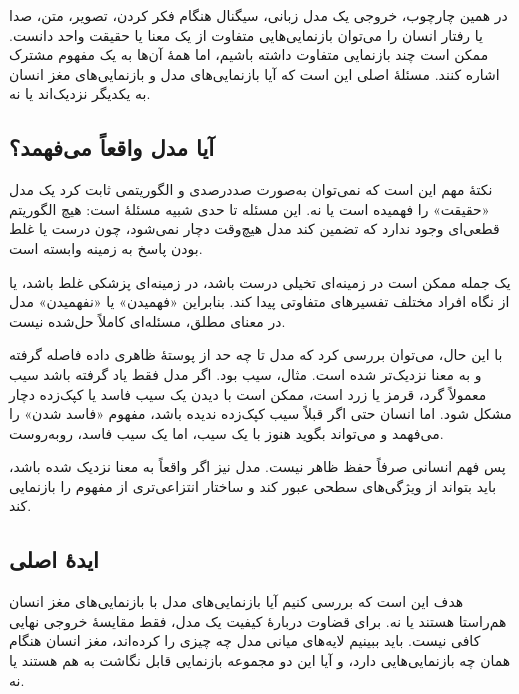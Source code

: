 در همین چارچوب، خروجی یک مدل زبانی، سیگنال  هنگام فکر کردن، تصویر، متن، صدا یا رفتار انسان را می‌توان بازنمایی‌هایی متفاوت از یک معنا یا حقیقت واحد دانست. ممکن است چند بازنمایی متفاوت داشته باشیم، اما همهٔ آن‌ها به یک مفهوم مشترک اشاره کنند. مسئلهٔ اصلی این است که آیا بازنمایی‌های مدل و بازنمایی‌های مغز انسان به یکدیگر نزدیک‌اند یا نه.


\subsection{آیا مدل واقعاً می‌فهمد؟}
نکتهٔ مهم این است که نمی‌توان به‌صورت صددرصدی و الگوریتمی ثابت کرد یک مدل «حقیقت» را فهمیده است یا نه. این مسئله تا حدی شبیه مسئلهٔ  است: هیچ الگوریتم قطعی‌ای وجود ندارد که تضمین کند مدل هیچ‌وقت دچار  نمی‌شود، چون درست یا غلط بودن پاسخ به زمینه وابسته است.

یک جمله ممکن است در زمینه‌ای تخیلی درست باشد، در زمینه‌ای پزشکی غلط باشد، یا از نگاه افراد مختلف تفسیرهای متفاوتی پیدا کند. بنابراین «فهمیدن» یا «نفهمیدن» مدل در معنای مطلق، مسئله‌ای کاملاً حل‌شده نیست.

با این حال، می‌توان بررسی کرد که مدل تا چه حد از پوستهٔ ظاهری داده فاصله گرفته و به معنا نزدیک‌تر شده است. مثال، سیب بود. اگر مدل فقط یاد گرفته باشد سیب معمولاً گرد، قرمز یا زرد است، ممکن است با دیدن یک سیب فاسد یا کپک‌زده دچار مشکل شود. اما انسان حتی اگر قبلاً سیب کپک‌زده ندیده باشد، مفهوم «فاسد شدن» را می‌فهمد و می‌تواند بگوید هنوز با یک سیب، اما یک سیب فاسد، روبه‌روست.

پس فهم انسانی صرفاً حفظ ظاهر نیست. مدل نیز اگر واقعاً به معنا نزدیک شده باشد، باید بتواند از ویژگی‌های سطحی عبور کند و ساختار انتزاعی‌تری از مفهوم را بازنمایی کند.

\subsection{ایدهٔ اصلی }
هدف  این است که بررسی کنیم آیا بازنمایی‌های مدل با بازنمایی‌های مغز انسان هم‌راستا هستند یا نه. برای قضاوت دربارهٔ کیفیت یک مدل، فقط مقایسهٔ خروجی نهایی کافی نیست. باید ببینیم لایه‌های میانی مدل چه چیزی را  کرده‌اند، مغز انسان هنگام همان  چه بازنمایی‌هایی دارد، و آیا این دو مجموعه بازنمایی قابل نگاشت به هم هستند یا نه.

